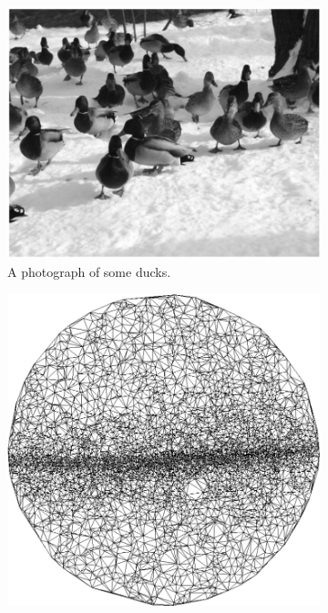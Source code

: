 \begin{figure}[htp]
    \centering
    \begin{subfigure}[t]{0.29\textwidth}
        \centering
        \captionsetup{justification=centering}
        \includegraphics[scale=0.34]{figures/fovealBefore}
        \caption{A photograph of some ducks.}
    \end{subfigure} \hfill%
    \begin{subfigure}[t]{0.29\textwidth}
        \centering
        \captionsetup{justification=centering}
        \includegraphics[scale=0.34]{figures/fovealMap}

\end{subfigure}
\end{figure}
